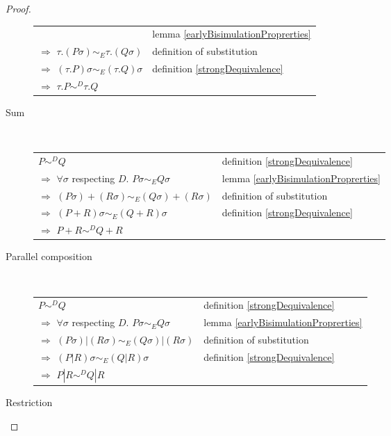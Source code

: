 \begin{lemma}
\begin{proof}
\begin{description}
\begin{center}
\begin{tabular}{ll}
	    &
	      lemma \ref{earlyBisimulationProprerties}
	  \\
	      $\Rightarrow$ $\tau.(P\sigma) \sim_{E} \tau.(Q\sigma)$
	    &
	      definition of substitution
	  \\
	      $\Rightarrow$ $(\tau.P)\sigma \sim_{E} (\tau.Q)\sigma$
	    &
	      definition \ref{strongDequivalence}
	  \\
	      $\Rightarrow$ $\tau.P \sim^{D} \tau.Q$
	    &
	  \end{tabular}
	\end{center}
      \item[Sum]\hfill \\
	\begin{center}
	  \begin{tabular}{ll}
	      $P \sim^{D} Q$
	    &
	      definition \ref{strongDequivalence}
	  \\
	      $\Rightarrow$ $\forall \sigma$ respecting $D.$ $P\sigma \sim_{E} Q\sigma$
	    &
	      lemma \ref{earlyBisimulationProprerties}
	  \\
	      $\Rightarrow$ $(P\sigma)+(R\sigma) \sim_{E} (Q\sigma)+(R\sigma)$
	    &
	      definition of substitution
	  \\
	      $\Rightarrow$ $(P+R)\sigma \sim_{E} (Q+R)\sigma$
	    &
	      definition \ref{strongDequivalence}
	  \\
	      $\Rightarrow$ $P+R \sim^{D} Q+R$
	    &
	  \end{tabular}
	\end{center}
      \item[Parallel composition]\hfill \\
	\begin{center}
	  \begin{tabular}{ll}
	      $P \sim^{D} Q$
	    &
	      definition \ref{strongDequivalence}
	  \\
	      $\Rightarrow$ $\forall \sigma$ respecting $D.$ $P\sigma \sim_{E} Q\sigma$
	    &
	      lemma \ref{earlyBisimulationProprerties}
	  \\
	      $\Rightarrow$ $(P\sigma)|(R\sigma) \sim_{E} (Q\sigma)|(R\sigma)$
	    &
	      definition of substitution
	  \\
	      $\Rightarrow$ $(P|R)\sigma \sim_{E} (Q|R)\sigma$
	    &
	      definition \ref{strongDequivalence}
	  \\
	      $\Rightarrow$ $P|R \sim^{D} Q|R$
	    &
	  \end{tabular}
	\end{center}
      \item[Restriction]

\end{description}
\end{proof}
\end{lemma}
